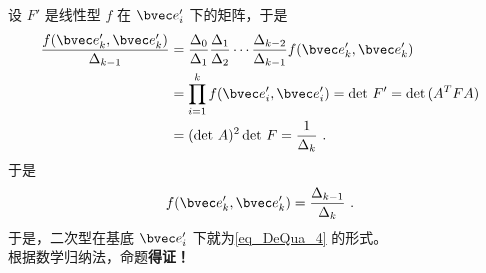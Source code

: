 \begin{enumerate}
设 $F'$ 是线性型 $f$ 在 $\bvec e'_i$ 下的矩阵，于是
\begin{equation}
\begin{aligned}
\frac{f(\bvec e'_k,\bvec e'_k)}{\Delta_{k-1}}&=\frac{\Delta_0}{\Delta_1}\frac{\Delta_1}{\Delta_2}\cdots\frac{\Delta_{k-2}}{\Delta_{k-1}}f(\bvec e'_k,\bvec e'_k)\\
&=\prod_{i=1}^k f(\bvec e'_i,\bvec e'_i)=\det\, F'=\det\, (A^TFA)\\
&=(\det{\,A})^2\det\, F=\frac{1}{\Delta_k}~.
\end{aligned}
\end{equation}
于是
\begin{equation}
f(\bvec e'_k,\bvec e'_k)=\frac{\Delta_{k-1}}{\Delta_k}~.
\end{equation}
于是，二次型在基底 $\bvec e'_i$ 下就为\autoref{eq_DeQua_4} 的形式。\\
根据数学归纳法，命题\textbf{得证！}
\end{enumerate}
